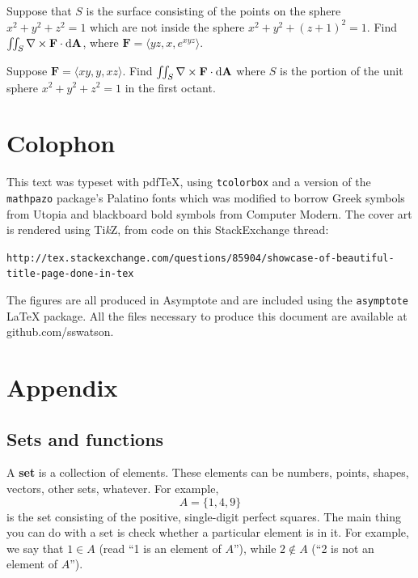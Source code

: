 \documentclass{watsonbook}
\begin{document}
\begin{exercise}{}{}
  Suppose that $S$ is the surface consisting of the points on the
  sphere $x^2 + y^2 + z^2 = 1$ which are not inside the sphere
  $x^2 + y^2 + (z+1)^2 = 1$. Find $\iint_{S} \nabla \times \mathbf{F}
  \cdot \mathrm{d}\mathbf{A}$, where $\mathbf{F} = \langle yz, x, e^{xyz}
  \rangle$. 
\end{exercise}

\begin{exercise}{}{}
  Suppose $\mathbf{F} = \langle xy, y, xz \rangle$. Find
  $\iint_S \nabla \times \mathbf{F} \cdot \mathrm{d}\mathbf{A}$ where $S$ is the portion
  of the unit sphere $x^2 + y^2 + z^2 = 1$ in the first octant.
\end{exercise}

\chapter*{Colophon}

This text was typeset with pdf\TeX, using \texttt{tcolorbox} and a version of the
\texttt{mathpazo} package's Palatino fonts which was modified to borrow
Greek symbols from Utopia and blackboard bold symbols from Computer
Modern. The cover art is rendered using Ti\textit{k}Z, from code on
this StackExchange thread:

\texttt{http://tex.stackexchange.com/questions/85904/showcase-of-beautiful-title-page-done-in-tex}

The figures are all produced in Asymptote and are included using the
\texttt{asymptote} LaTeX package. All the files necessary to produce
this document are available at github.com/sswatson.

\appendix

\chapter{Appendix} 

\section{Sets and functions}  \label{a:setsandfunctions}

A \textbf{set} is a collection of elements. These elements can be numbers, points, shapes, vectors, other sets, whatever. For example, 
\[
  A = \{1,4,9\} 
\]
is the set consisting of the positive, single-digit perfect squares. The main thing you can do with a set is check whether a particular element is in it. For example, we say that $1 \in A$ (read ``1 is an element of $A$''), while $2 \notin A$ (``2 is not an element of $A$''). 
\end{document}
